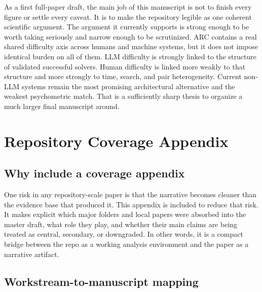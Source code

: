 \documentclass[11pt,letterpaper]{article}
\begin{document}
As a first full-paper draft, the main job of this manuscript is not to finish every figure or settle every caveat. It is to make the repository legible as one coherent scientific argument. The argument it currently supports is strong enough to be worth taking seriously and narrow enough to be scrutinized. ARC contains a real shared difficulty axis across humans and machine systems, but it does not impose identical burden on all of them. LLM difficulty is strongly linked to the structure of validated successful solvers. Human difficulty is linked more weakly to that structure and more strongly to time, search, and pair heterogeneity. Current non-LLM systems remain the most promising architectural alternative and the weakest psychometric match. That is a sufficiently sharp thesis to organize a much larger final manuscript around.

\appendix
\section{Repository Coverage Appendix}

\subsection{Why include a coverage appendix}

One risk in any repository-scale paper is that the narrative becomes cleaner than the evidence base that produced it. This appendix is included to reduce that risk. It makes explicit which major folders and local papers were absorbed into the master draft, what role they play, and whether their main claims are being treated as central, secondary, or downgraded. In other words, it is a compact bridge between the repo as a working analysis environment and the paper as a narrative artifact.

\subsection{Workstream-to-manuscript mapping}
\end{document}
